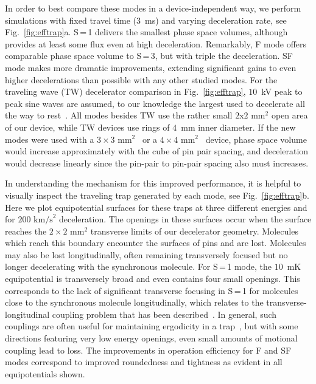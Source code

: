 \documentclass[%
 reprint,
 amsmath,amssymb,
 aps,
prl,
]{revtex4-1}
\begin{document}
In order to best compare these modes in a device-independent way, we perform simulations with fixed travel time ($3$~ms) and varying deceleration rate, see Fig.~\ref{fig:efftrap}a.
S\,=\,1 delivers the smallest phase space volumes, although provides at least some flux even at high deceleration.
Remarkably, F mode offers comparable phase space volume to S\,=\,3, but with triple the deceleration.
SF mode makes more dramatic improvements, extending significant gains to even higher decelerations than possible with any other studied modes.
For the traveling wave (TW) decelerator comparison in Fig.~\ref{fig:efftrap}, $10$~kV peak to peak sine waves are assumed, to our knowledge the largest used to decelerate all the way to rest~\cite{Quintero-Perez2013}.
All modes besides TW use the rather small $2$x$2\text{ mm}^2$ open area of our device, while TW devices use rings of $4$~mm inner diameter.
If the new modes were used with a $3\times3\text{ mm}^2$~\cite{Scharfenberg2009} or a $4\times4\text{ mm}^2$~\cite{VandeMeerakker2005} device, phase space volume would increase approximately with the cube of pin pair spacing, and deceleration would decrease linearly since the pin-pair to pin-pair spacing also must increases.

In understanding the mechanism for this improved performance, it is helpful to visually inspect the traveling trap generated by each mode, see Fig.~\ref{fig:efftrap}b.
Here we plot equipotential surfaces for these traps at three different energies and for $200 \text{ km/s}^2$ deceleration.
The openings in these surfaces occur when the surface reaches the $2 \times 2\text{ mm}^2$ transverse limits of our decelerator geometry.
Molecules which reach this boundary encounter the surfaces of pins and are lost.
Molecules may also be lost longitudinally, often remaining transversely focused but no longer decelerating with the synchronous molecule.
For S\,=\,1 mode, the $10$~mK equipotential is transversely broad and even contains four small openings.
This corresponds to the lack of significant transverse focusing in S\,=\,1 for molecules close to the synchronous molecule longitudinally, which relates to the transverse-longitudinal coupling problem that has been described~\cite{VanDeMeerakker2006}.
In general, such couplings are often useful for maintaining ergodicity in a trap~\cite{Surkov1996}, but with some directions featuring very low energy openings, even small amounts of motional coupling lead to loss.
The improvements in operation efficiency for F and SF modes correspond to improved roundedness and tightness as evident in all equipotentials shown.
\end{document}

